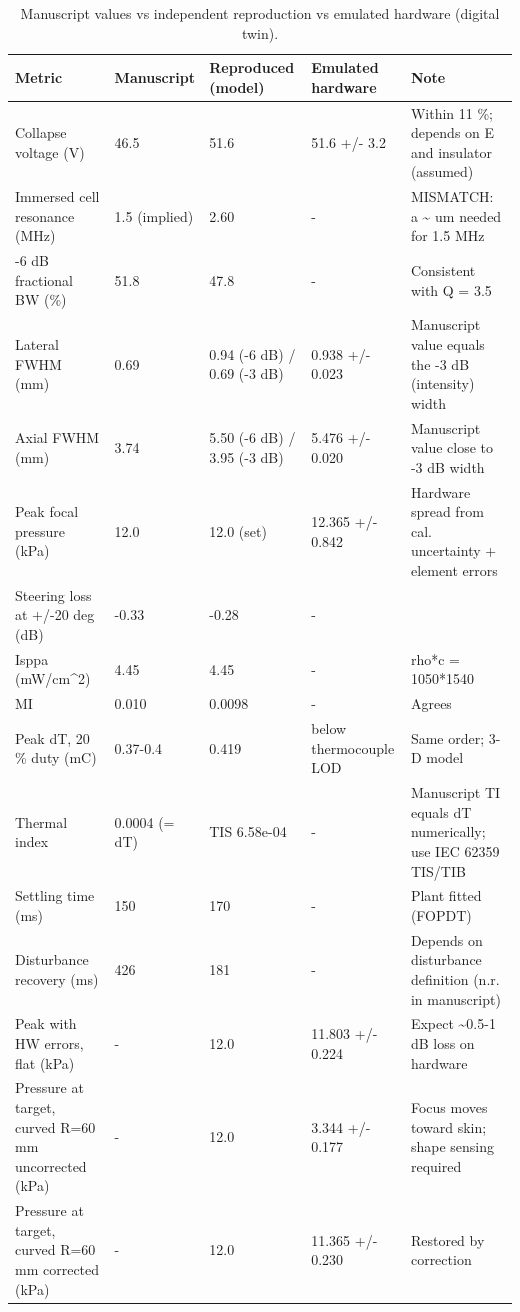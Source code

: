 \begin{table}
\caption{Manuscript values vs independent reproduction vs emulated hardware (digital twin).}
\label{tab:T_S0_manuscript_vs_reproduced}
\begin{tabular}{lllll}
\toprule
Metric & Manuscript & Reproduced (model) & Emulated hardware & Note \\
\midrule
Collapse voltage (V) & 46.5 & 51.6 & 51.6 +/- 3.2 & Within 11 \%; depends on E and insulator (assumed) \\
Immersed cell resonance (MHz) & 1.5 (implied) & 2.60 & - & MISMATCH: a \textasciitilde \space 37.7 um needed for 1.5 MHz \\
-6 dB fractional BW (\%) & 51.8 & 47.8 & - & Consistent with Q = 3.5 \\
Lateral FWHM (mm) & 0.69 & 0.94 (-6 dB) / 0.69 (-3 dB) & 0.938 +/- 0.023 & Manuscript value equals the -3 dB (intensity) width \\
Axial FWHM (mm) & 3.74 & 5.50 (-6 dB) / 3.95 (-3 dB) & 5.476 +/- 0.020 & Manuscript value close to -3 dB width \\
Peak focal pressure (kPa) & 12.0 & 12.0 (set) & 12.365 +/- 0.842 & Hardware spread from cal. uncertainty + element errors \\
Steering loss at +/-20 deg (dB) & -0.33 & -0.28 & - &  \\
Isppa (mW/cm\textasciicircum 2) & 4.45 & 4.45 & - & rho*c = 1050*1540 \\
MI & 0.010 & 0.0098 & - & Agrees \\
Peak dT, 20 \% duty (mC) & 0.37-0.4 & 0.419 & below thermocouple LOD & Same order; 3-D model \\
Thermal index & 0.0004 (= dT) & TIS 6.58e-04 & - & Manuscript TI equals dT numerically; use IEC 62359 TIS/TIB \\
Settling time (ms) & 150 & 170 & - & Plant fitted (FOPDT) \\
Disturbance recovery (ms) & 426 & 181 & - & Depends on disturbance definition (n.r. in manuscript) \\
Peak with HW errors, flat (kPa) & - & 12.0 & 11.803 +/- 0.224 & Expect \textasciitilde 0.5-1 dB loss on hardware \\
Pressure at target, curved R=60 mm uncorrected (kPa) & - & 12.0 & 3.344 +/- 0.177 & Focus moves toward skin; shape sensing required \\
Pressure at target, curved R=60 mm corrected (kPa) & - & 12.0 & 11.365 +/- 0.230 & Restored by correction \\
\bottomrule
\end{tabular}
\end{table}
